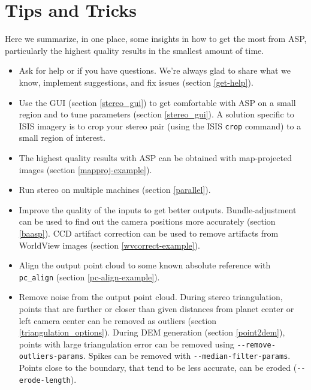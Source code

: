 \chapter{Tips and Tricks}

Here we summarize, in one place, some insights in how to get the most
from ASP, particularly the highest quality results in the smallest
amount of time.

\begin{itemize}
\item Ask for help or if you have questions. We're always glad to share
what we know, implement suggestions, and fix issues (section
\ref{get-help}).

\item Use the GUI (section \ref{stereo_gui}) to get comfortable with ASP
on a small region and to tune parameters (section \ref{stereo_gui}). A
solution specific to ISIS imagery is to crop your stereo pair (using the
ISIS \texttt{crop} command) to a small region of interest.

\item The highest quality results with ASP can be obtained with
  map-projected images (section \ref{mapproj-example}).

\item Run stereo on multiple machines (section \ref{parallel}).

\item Improve the quality of the inputs to get better outputs.
Bundle-adjustment can be used to find out the camera positions more
accurately (section \ref{baasp}). CCD artifact correction can be used
to remove artifacts from WorldView images (section
\ref{wvcorrect-example}).

\item Align the output point cloud to some known absolute reference with
\texttt{pc\_align} (section \ref{pc-align-example}).

\item Remove noise from the output point cloud. During stereo
triangulation, points that are further or closer than given distances
from planet center or left camera center can be removed as outliers
(section \ref{triangulation_options}). During DEM generation (section
\ref{point2dem}), points with large triangulation error can be removed
using \texttt{-\/-remove-outliers-params}. Spikes can be removed with
\texttt{-\/-median-filter-params}. Points close to the boundary, that
tend to be less accurate, can be eroded (\texttt{-\/-erode-length}).


\end{itemize}
